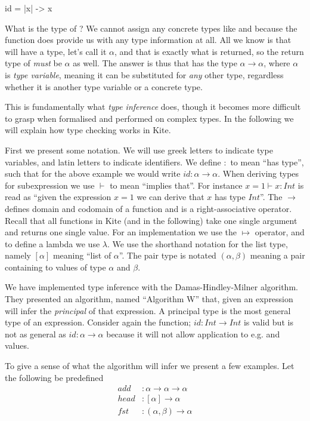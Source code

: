 \begin{kite}
id = |x| -> { x }
\end{kite}

What is the type of ? We cannot assign any concrete types like  and  because the function does provide us with any type information at all. All we know is that  will have a type, let's call it $\alpha$, and that  is exactly what is returned, so the return type of  \emph{must} be $\alpha$ as well. The answer is thus that  has the type $\alpha \to \alpha$, where $\alpha$ is \emph{type variable}, meaning it can be substituted for \emph{any} other type, regardless whether it is another type variable or a concrete type.

This is fundamentally what \emph{type inference} does, though it becomes more difficult to grasp when formalised and performed on complex types. In the following we will explain how type checking works in Kite.

First we present some notation. We will use greek letters to indicate type variables, and latin letters to indicate identifiers. We define $:$ to mean ``has type'', such that for the above example we would write $id: \alpha \to \alpha$. When deriving types for subexpression we use $\vdash$ to mean ``implies that''. For instance $x = 1 \vdash x : Int$ is read as ``given the expression $x = 1$ we can derive that $x$ has type $Int$''. The $\to$ defines domain and codomain of a function and is a right-associative operator. Recall that all functions in Kite (and in the following) take one single argument and returns one single value. For an implementation we use the $\mapsto$ operator, and to define a lambda we use $\lambda$. We use the shorthand notation for the list type, namely $[\alpha]$ meaning ``list of $\alpha$''. The pair type is notated $(\alpha, \beta)$ meaning a pair containing to values of type $\alpha$ and $\beta$.

We have implemented type inference with the Damas-Hindley-Milner algorithm. They presented an algorithm, named ``Algorithm W''\cite[sec. 6]{milner82} that, given an expression will infer the \emph{principal} of that expression. A principal type is the most general type of an expression. Consider again the  function; $id:Int \to Int$ is valid but is not as general as $id: \alpha \to \alpha$ because it will not allow application to e.g.  and  values.

To give a sense of what the algorithm will infer we present a few examples. Let the following be predefined
\begin{align*}
  add    & : \alpha \to \alpha \to \alpha\\
  head   & : [\alpha] \to \alpha   \\
  fst    & : (\alpha, \beta) \to \alpha
\end{align*}

